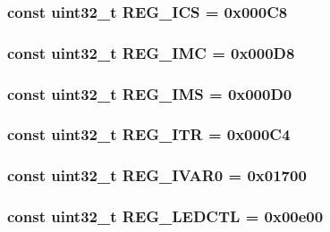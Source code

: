 \label{namespaceiGbReg_a24c53e651278cac8ad2d31eb921e4879}
\hypertarget{namespaceiGbReg_a97f7e3206e6b84e95085a5b08b4d937c}{
\subsubsection[{REG\_\-ICS}]{\setlength{\rightskip}{0pt plus 5cm}const {\bf uint32\_\-t} {\bf REG\_\-ICS} = 0x000C8}}
\label{namespaceiGbReg_a97f7e3206e6b84e95085a5b08b4d937c}
\hypertarget{namespaceiGbReg_ab04ba4481c50d2448a63080c40c33a43}{
\subsubsection[{REG\_\-IMC}]{\setlength{\rightskip}{0pt plus 5cm}const {\bf uint32\_\-t} {\bf REG\_\-IMC} = 0x000D8}}
\label{namespaceiGbReg_ab04ba4481c50d2448a63080c40c33a43}
\hypertarget{namespaceiGbReg_afed6fab07c4f60999dfbe0e3baf80dca}{
\subsubsection[{REG\_\-IMS}]{\setlength{\rightskip}{0pt plus 5cm}const {\bf uint32\_\-t} {\bf REG\_\-IMS} = 0x000D0}}
\label{namespaceiGbReg_afed6fab07c4f60999dfbe0e3baf80dca}
\hypertarget{namespaceiGbReg_ac96a5f971fc136ea2bcd3aebbff561c4}{
\subsubsection[{REG\_\-ITR}]{\setlength{\rightskip}{0pt plus 5cm}const {\bf uint32\_\-t} {\bf REG\_\-ITR} = 0x000C4}}
\label{namespaceiGbReg_ac96a5f971fc136ea2bcd3aebbff561c4}
\hypertarget{namespaceiGbReg_aebdef83062f3325649e7ef6bf35b4e9d}{
\subsubsection[{REG\_\-IVAR0}]{\setlength{\rightskip}{0pt plus 5cm}const {\bf uint32\_\-t} {\bf REG\_\-IVAR0} = 0x01700}}
\label{namespaceiGbReg_aebdef83062f3325649e7ef6bf35b4e9d}
\hypertarget{namespaceiGbReg_a15c1307f1e65e489f3ca5fb75212d71d}{
\subsubsection[{REG\_\-LEDCTL}]{\setlength{\rightskip}{0pt plus 5cm}const {\bf uint32\_\-t} {\bf REG\_\-LEDCTL} = 0x00e00}}
